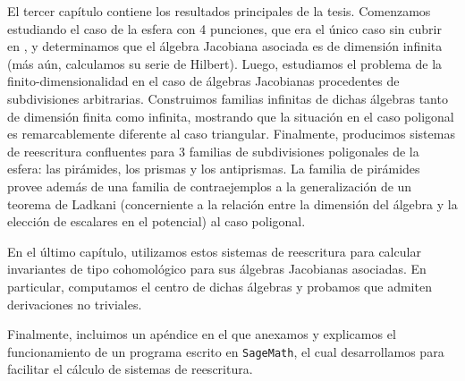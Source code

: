 \begin{chapter}
El tercer capítulo contiene los resultados principales de la tesis. Comenzamos estudiando el caso de la esfera con 4 punciones, que era el único caso sin cubrir en \cite{Lad12}, y determinamos que el álgebra Jacobiana asociada es de dimensión infinita (más aún, calculamos su serie de Hilbert). Luego, estudiamos el problema de la finito-dimensionalidad en el caso de álgebras Jacobianas procedentes de subdivisiones arbitrarias. Construimos familias infinitas de dichas álgebras tanto de dimensión finita como infinita, mostrando que la situación en el caso poligonal es remarcablemente diferente al caso triangular. Finalmente, producimos sistemas de reescritura confluentes para 3 familias de subdivisiones poligonales de la esfera: las pirámides, los prismas y los antiprismas. La familia de pirámides provee además de una familia de contraejemplos a la generalización de un teorema de Ladkani (concerniente a la relación entre la dimensión del álgebra y la elección de escalares en el potencial) al caso poligonal.

En el último capítulo, utilizamos estos sistemas de reescritura para calcular invariantes de tipo cohomológico para sus álgebras Jacobianas asociadas. En particular, computamos el centro de dichas álgebras y probamos que admiten derivaciones no triviales.

Finalmente, incluimos un apéndice en el que anexamos y explicamos el funcionamiento de un programa escrito en \texttt{SageMath}, el cual desarrollamos para facilitar el cálculo de sistemas de reescritura.
\end{chapter}